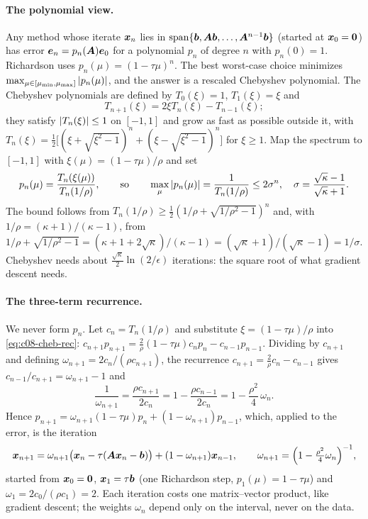 \paragraph{The polynomial view.} Any method whose iterate $\bm{x}_n$ lies in
$\mathrm{span}\{\bm{b},\bm{A}\bm{b},\dots,\bm{A}^{n-1}\bm{b}\}$ (started at $\bm{x}_0=\bm{0}$) has error
$\bm{e}_n=p_n(\bm{A})\bm{e}_0$ for a polynomial $p_n$ of degree $n$ with $p_n(0)=1$. Richardson uses
$p_n(\mu)=(1-\tau\mu)^n$. The best worst-case choice minimizes $\max_{\mu\in[\mu_{\min},\mu_{\max}]}
\left\lvert p_n(\mu)\right\rvert$, and the answer is a rescaled Chebyshev polynomial. The Chebyshev polynomials are
defined by $T_0(\xi)=1$, $T_1(\xi)=\xi$ and
\begin{equation}\label{eq:c08-cheb-rec}
  T_{n+1}(\xi)=2\xi T_n(\xi)-T_{n-1}(\xi);
\end{equation}
they satisfy $\left\lvert T_n(\xi)\right\rvert\le1$ on $[-1,1]$ and grow as fast as possible outside it, with
$T_n(\xi)=\tfrac12\bigl[(\xi+\sqrt{\xi^2-1})^n+(\xi-\sqrt{\xi^2-1})^n\bigr]$ for $\xi\ge1$. Map the
spectrum to $[-1,1]$ with $\xi(\mu)=(1-\tau\mu)/\rho$ and set
\begin{equation}\label{eq:c08-cheb-poly}
  p_n(\mu)=\frac{T_n(\xi(\mu))}{T_n(1/\rho)},\qquad\text{so}\qquad
  \max_{\mu}\left\lvert p_n(\mu)\right\rvert=\frac{1}{T_n(1/\rho)}\le 2\sigma^n,\quad
  \sigma=\frac{\sqrt\kappa-1}{\sqrt\kappa+1}.
\end{equation}
The bound follows from $T_n(1/\rho)\ge\tfrac12(1/\rho+\sqrt{1/\rho^2-1})^n$ and, with
$1/\rho=(\kappa+1)/(\kappa-1)$, from
$1/\rho+\sqrt{1/\rho^2-1}=(\kappa+1+2\sqrt\kappa)/(\kappa-1)=(\sqrt\kappa+1)/(\sqrt\kappa-1)=1/\sigma$.
Chebyshev needs about $\tfrac{\sqrt\kappa}{2}\ln(2/\epsilon)$ iterations: the square root of what
gradient descent needs.

\paragraph{The three-term recurrence.} We never form $p_n$. Let $c_n=T_n(1/\rho)$ and substitute
$\xi=(1-\tau\mu)/\rho$ into \eqref{eq:c08-cheb-rec}: $c_{n+1}p_{n+1}=\tfrac{2}{\rho}(1-\tau\mu)c_np_n
-c_{n-1}p_{n-1}$. Dividing by $c_{n+1}$ and defining $\omega_{n+1}=2c_n/(\rho c_{n+1})$, the
recurrence $c_{n+1}=\tfrac2\rho c_n-c_{n-1}$ gives $c_{n-1}/c_{n+1}=\omega_{n+1}-1$ and
\[
  \frac{1}{\omega_{n+1}}=\frac{\rho c_{n+1}}{2c_n}=1-\frac{\rho c_{n-1}}{2c_n}
  =1-\frac{\rho^2}{4}\,\omega_n .
\]
Hence $p_{n+1}=\omega_{n+1}(1-\tau\mu)p_n+(1-\omega_{n+1})p_{n-1}$, which, applied to the error,
is the iteration \citep{c08-golub1961chebyshev}
\begin{equation}\label{eq:c08-cheb-iter}
  \bm{x}_{n+1}=\omega_{n+1}\bigl(\bm{x}_n-\tau(\bm{A}\bm{x}_n-\bm{b})\bigr)+(1-\omega_{n+1})\bm{x}_{n-1},\qquad
  \omega_{n+1}=\Bigl(1-\tfrac{\rho^2}{4}\omega_n\Bigr)^{-1},
\end{equation}
started from $\bm{x}_0=\bm{0}$, $\bm{x}_1=\tau\bm{b}$ (one Richardson step, $p_1(\mu)=1-\tau\mu$) and
$\omega_1=2c_0/(\rho c_1)=2$. Each iteration costs one matrix--vector product, like gradient
descent; the weights $\omega_n$ depend only on the interval, never on the data.

